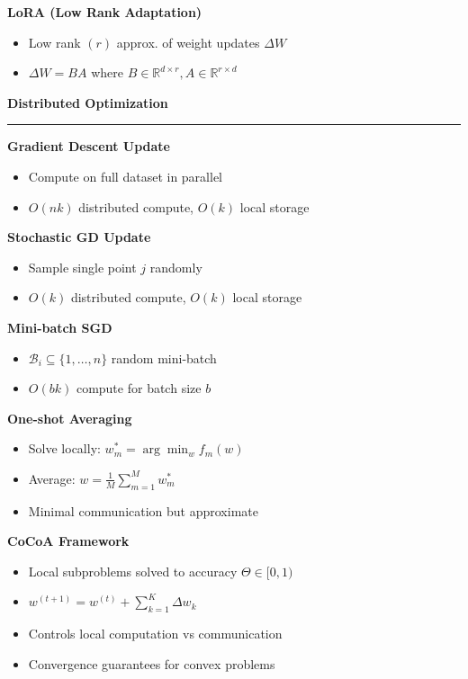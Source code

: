 \documentclass[8pt,letter,landscape]{article}
\newcommand{\sectiontitle}[1]{\textbf{\large #1}\vspace{0.2em}\hrule\vspace{0.5em}}
\begin{document}
\begin{multicols*}{3}
\vspace{2em}
\textbf{LoRA (Low Rank Adaptation)}
\begin{itemize}[leftmargin=*,nosep]
    \item Low rank $(r)$ approx. of weight updates $\Delta W$
    \item $\Delta W = BA$ where $B \in \mathbb{R}^{d \times r}, A \in \mathbb{R}^{r \times d}$
\end{itemize}

\sectiontitle{Distributed Optimization}

\textbf{Gradient Descent Update}
\begin{itemize}[leftmargin=*,nosep]
    \item Compute on full dataset in parallel
    \item $O(nk)$ distributed compute, $O(k)$ local storage
\end{itemize}

\textbf{Stochastic GD Update}
\begin{itemize}[leftmargin=*,nosep]
    \item Sample single point $j$ randomly
    \item $O(k)$ distributed compute, $O(k)$ local storage
\end{itemize}

\textbf{Mini-batch SGD}
\begin{itemize}[leftmargin=*,nosep]
    \item $\mathcal{B}_i \subseteq \{1,\dots,n\}$ random mini-batch
    \item $O(bk)$ compute for batch size $b$
\end{itemize}

\textbf{One-shot Averaging}
\begin{itemize}[leftmargin=*,nosep]
    \item Solve locally: $w_m^* = \arg\min_{w} f_m(w)$
    \item Average: $w = \frac{1}{M}\sum_{m=1}^M w_m^*$
    \item Minimal communication but approximate
\end{itemize}

\textbf{CoCoA Framework}
\begin{itemize}[leftmargin=*,nosep]
    \item Local subproblems solved to accuracy $\Theta \in [0,1)$
    \item $w^{(t+1)} = w^{(t)} + \sum_{k=1}^K \Delta w_k$
    \item Controls local computation vs communication
    \item Convergence guarantees for convex problems
\end{itemize}


\end{multicols*}
\end{document}
